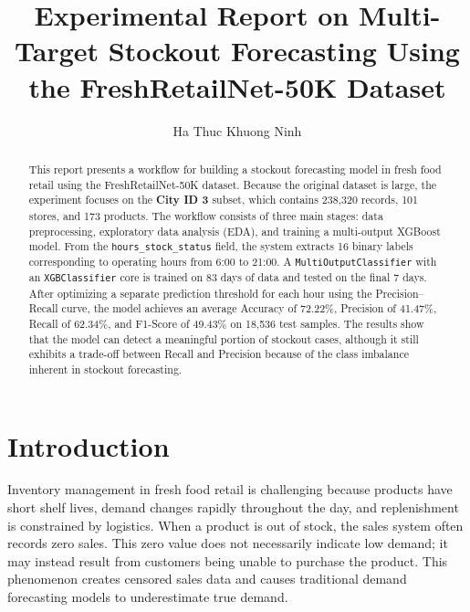 \documentclass{llncs}
\begin{document}
\pagestyle{empty}

\title{Experimental Report on Multi-Target Stockout Forecasting Using the FreshRetailNet-50K Dataset}
\author{Ha Thuc Khuong Ninh}


\maketitle
\thispagestyle{empty}

\begin{abstract}
This report presents a workflow for building a stockout forecasting model in fresh food retail using the FreshRetailNet-50K dataset. Because the original dataset is large, the experiment focuses on the \textbf{City ID 3} subset, which contains 238,320 records, 101 stores, and 173 products. The workflow consists of three main stages: data preprocessing, exploratory data analysis (EDA), and training a multi-output XGBoost model. From the \texttt{hours\_stock\_status} field, the system extracts 16 binary labels corresponding to operating hours from 6:00 to 21:00. A \texttt{MultiOutputClassifier} with an \texttt{XGBClassifier} core is trained on 83 days of data and tested on the final 7 days. After optimizing a separate prediction threshold for each hour using the Precision--Recall curve, the model achieves an average Accuracy of 72.22\%, Precision of 41.47\%, Recall of 62.34\%, and F1-Score of 49.43\% on 18,536 test samples. The results show that the model can detect a meaningful portion of stockout cases, although it still exhibits a trade-off between Recall and Precision because of the class imbalance inherent in stockout forecasting.
\end{abstract}

\section{Introduction}
Inventory management in fresh food retail is challenging because products have short shelf lives, demand changes rapidly throughout the day, and replenishment is constrained by logistics. When a product is out of stock, the sales system often records zero sales. This zero value does not necessarily indicate low demand; it may instead result from customers being unable to purchase the product. This phenomenon creates censored sales data and causes traditional demand forecasting models to underestimate true demand.
\end{document}

